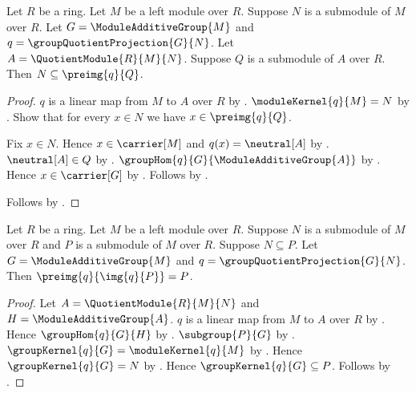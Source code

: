\begin{theorem}\label{module_quotient_correspondence_preimage_contains_kernel}
    Let $R$ be a ring.
    Let $M$ be a left module over $R$.
    Suppose $N$ is a submodule of $M$ over $R$.
    Let $G=\ModuleAdditiveGroup{M}$ and
        $q=\groupQuotientProjection{G}{N}$.
    Let $A=\QuotientModule{R}{M}{N}$.
    Suppose $Q$ is a submodule of $A$ over $R$.
    Then $N\subseteq\preimg{q}{Q}$.
\end{theorem}
\begin{proof}
    $q$ is a linear map from $M$ to $A$ over $R$ by
        .
    $\moduleKernel{q}{M}=N$ by
        .
    Show that for every $x\in N$ we have $x\in\preimg{q}{Q}$.
    \begin{subproof}
        Fix $x\in N$.
        Hence $x\in\carrier[M]$ and $q(x)=\neutral[A]$ by
            .
        $\neutral[A]\in Q$ by .
        $\groupHom{q}{G}{\ModuleAdditiveGroup{A}}$ by
            .
        Hence $x\in\carrier[G]$ by
            .
        Follows by
            .
    \end{subproof}
    Follows by .
\end{proof}

\begin{theorem}\label{module_quotient_correspondence_preimage_image}
    Let $R$ be a ring.
    Let $M$ be a left module over $R$.
    Suppose $N$ is a submodule of $M$ over $R$ and
        $P$ is a submodule of $M$ over $R$.
    Suppose $N\subseteq P$.
    Let $G=\ModuleAdditiveGroup{M}$ and
        $q=\groupQuotientProjection{G}{N}$.
    Then $\preimg{q}{\img{q}{P}}=P$.
\end{theorem}
\begin{proof}
    Let $A=\QuotientModule{R}{M}{N}$ and
        $H=\ModuleAdditiveGroup{A}$.
    $q$ is a linear map from $M$ to $A$ over $R$ by
        .
    Hence $\groupHom{q}{G}{H}$ by
        .
    $\subgroup{P}{G}$ by .
    $\groupKernel{q}{G}=\moduleKernel{q}{M}$ by
        .
    Hence $\groupKernel{q}{G}=N$ by
        .
    Hence $\groupKernel{q}{G}\subseteq P$.
    Follows by .
\end{proof}

